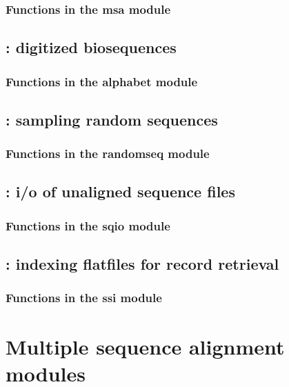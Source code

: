 \documentclass[10pt]{book}
\begin{document}
\subsection{Functions in the msa module}


\newpage
\section{: digitized biosequences}

\subsection{Functions in the alphabet module}


\newpage
\section{: sampling random sequences}

\subsection{Functions in the randomseq module}


\newpage
\section{: i/o of unaligned sequence files}

\subsection{Functions in the sqio module}


\newpage
\section{: indexing flatfiles for record retrieval}

\subsection{Functions in the ssi module}



\chapter{Multiple sequence alignment modules}
\end{document}
